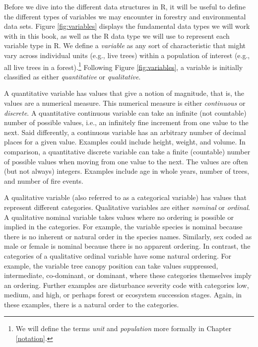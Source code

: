 \documentclass[
  11pt,
]{krantz}
\theoremstyle{definition}
\theoremstyle{definition}
\theoremstyle{definition}
\theoremstyle{definition}
\theoremstyle{remark}
\begin{document}
Before we dive into the different data structures in R, it will be useful to define the different types of variables we may encounter in forestry and environmental data sets. Figure \ref{fig:variables} displays the fundamental data types we will work with in this book, as well as the R data type we will use to represent each variable type in R. We define a \emph{variable} as any sort of characteristic that might vary across individual units (e.g., live trees) within a population of interest (e.g., all live trees in a forest).\footnote{We will define the terms \emph{unit} and \emph{population} more formally in Chapter \ref{notation}.} Following Figure \ref{fig:variables}, a variable is initially classified as either \emph{quantitative} or \emph{qualitative}.

A quantitative variable has values that give a notion of magnitude, that is, the values are a numerical measure. This numerical measure is either \emph{continuous} or \emph{discrete}. A quantitative continuous variable can take an infinite (not countable) number of possible values, i.e., an infinitely fine increment from one value to the next. Said differently, a continuous variable has an arbitrary number of decimal places for a given value. Examples could include height, weight, and volume. In comparison, a quantitative discrete variable can take a finite (countable) number of possible values when moving from one value to the next. The values are often (but not always) integers. Examples include age in whole years, number of trees, and number of fire events.

A qualitative variable (also referred to as a categorical variable) has values that represent different categories. Qualitative variables are either \emph{nominal} or \emph{ordinal}. A qualitative nominal variable takes values where no ordering is possible or implied in the categories. For example, the variable species is nominal because there is no inherent or natural order in the species names. Similarly, sex coded as male or female is nominal because there is no apparent ordering. In contrast, the categories of a qualitative ordinal variable have some natural ordering. For example, the variable tree canopy position can take values suppressed, intermediate, co-dominant, or dominant, where these categories themselves imply an ordering. Further examples are disturbance severity code with categories low, medium, and high, or perhaps forest or ecosystem succession stages. Again, in these examples, there is a natural order to the categories.
\end{document}
